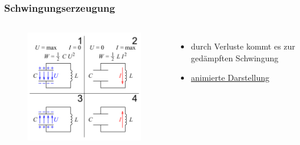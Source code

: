 \begin{frame}
  \frametitle{Schwingungserzeugung}
  \begin{columns}
    \begin{center}
      \begin{figure}
        \includegraphics[width=\textwidth,height=.75\textheight,keepaspectratio]{a04/Schwingkreis.png}
      \end{figure}
    \end{center}
    \begin{itemize}
      \item durch Verluste kommt es zur gedämpften Schwingung\\
      \item \href{http://en.wikipedia.org/wiki/File:Tuned_circuit_animation_3.gif}{\ExternalLink animierte Darstellung}
    \end{itemize}
  \end{columns}
\end{frame}

